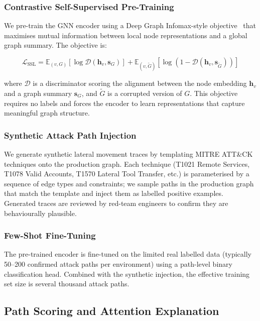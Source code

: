 \documentclass[sigconf,nonacm]{acmart}
\begin{document}
\subsubsection{Contrastive Self-Supervised Pre-Training}

We pre-train the GNN encoder using a Deep Graph Infomax-style
objective~\cite{velickovic2019dgi} that maximises mutual information between
local node representations and a global graph summary. The objective is:

\begin{equation}
  \mathcal{L}_\text{SSL} = \mathbb{E}_{(v,G)}\!\left[\log \mathcal{D}(\mathbf{h}_v,
  \mathbf{s}_G)\right] +
  \mathbb{E}_{(v,\tilde G)}\!\left[\log(1 - \mathcal{D}(\mathbf{h}_v,
  \mathbf{s}_{\tilde G}))\right]
\end{equation}

where $\mathcal{D}$ is a discriminator scoring the alignment between the node
embedding $\mathbf{h}_v$ and a graph summary $\mathbf{s}_G$, and $\tilde G$
is a corrupted version of $G$. This objective requires no labels and forces
the encoder to learn representations that capture meaningful graph structure.

\subsubsection{Synthetic Attack Path Injection}

We generate synthetic lateral movement traces by templating MITRE ATT\&CK
techniques onto the production graph. Each technique (T1021 Remote Services,
T1078 Valid Accounts, T1570 Lateral Tool Transfer, etc.) is parameterised by
a sequence of edge types and constraints; we sample paths in the production
graph that match the template and inject them as labelled positive examples.
Generated traces are reviewed by red-team engineers to confirm they are
behaviourally plausible.

\subsubsection{Few-Shot Fine-Tuning}

The pre-trained encoder is fine-tuned on the limited real labelled data
(typically 50--200 confirmed attack paths per environment) using a path-level
binary classification head. Combined with the synthetic injection, the
effective training set size is several thousand attack paths.

\subsection{Path Scoring and Attention Explanation}
\end{document}
